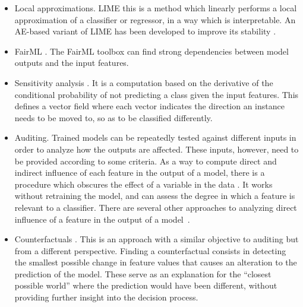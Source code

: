 \begin{itemize}
    \item Local approximations. LIME  this is a method which linearly performs a local approximation of a classifier or regressor, in a way which is interpretable. An AE-based variant of LIME has been developed to improve its stability .
    \item FairML . The FairML toolbox can find strong dependencies between model outputs and the input features. 
    \item Sensitivity analysis . It is a computation based on the derivative of the conditional probability of not predicting a class given the input features. This defines a vector field where each vector indicates the direction an instance needs to be moved to, so as to be classified differently.
    \item Auditing. %
    Trained models can be repeatedly tested against different inputs in order to analyze how the outputs are affected. These inputs, however, need to be provided according to some criteria. As a way to compute direct and indirect influence of each feature in the output of a model, there is a procedure which obscures the effect of a variable in the data . It works without retraining the model, and can assess the degree in which a feature is relevant to a classifier. There are several other approaches to analyzing direct influence of a feature in the output of a model~.
    \item Counterfactuals . This is an approach with a similar objective to auditing but from a different perspective. Finding a counterfactual consists in detecting the smallest possible change in feature values that causes an alteration to the prediction of the model. These serve as an explanation for the ``closest possible world'' where the prediction would have been different, without providing further insight into the decision process.

\end{itemize}

